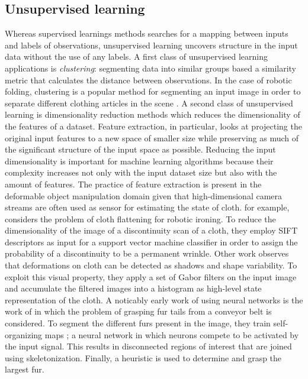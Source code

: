 \documentclass[\home/main.tex]{subfiles}
\begin{document}
\subsection{Unsupervised learning}
Whereas supervised learnings methods searches for a mapping between inputs and labels of observations, unsupervised learning uncovers structure in the input data without the use of any labels.
A first class of unsupervised learning applications is \emph{clustering}: segmenting data into similar groups based a similarity metric that calculates the distance between observations. In the case of robotic folding, clustering is a popular method for segmenting an input image in order to separate different clothing articles in the scene \autocite{Doumanoglou2016,Maitin2010,Jia2018}. A second class of unsupervised learning is dimensionality reduction methods which reduces the dimensionality of the features of a dataset. Feature extraction, in particular, looks at projecting the original input features to a new space of smaller size while preserving as much of the significant structure of the input space as possible. Reducing the input dimensionality is important for machine learning algorithms because their complexity increases not only with the input dataset size but also with the amount of features. 
The practice of feature extraction is present in the deformable object manipulation domain given that high-dimensional camera streams are often used as sensor for estimating the state of cloth. \textcite{li2016multi} for example, considers the problem of cloth flattening for robotic ironing. To reduce the dimensionality of the image of a discontinuity scan of a cloth, they employ SIFT descriptors \autocite{lowe1999object} as input for a support vector machine classifier in order to assign the probability of a discontinuity to be a permanent wrinkle. Other work \autocite{Jia2018} observes that deformations on cloth can be detected as shadows and shape variability. To exploit this visual property, they apply a set of Gabor filters on the input image and accumulate the filtered images into a histogram as high-level state representation of the cloth.
A noticably early work of using neural networks is the work of \textcite{Foresti2004} in which the problem of grasping fur tails from a conveyor belt is considered. To segment the different furs present in the image, they train self-organizing maps \autocite{Kohonen1982}; a neural network in which neurons compete to be activated by the input signal. This results in disconnected regions of interest that are joined using skeletonization. Finally, a heuristic is used to determine and grasp the largest fur.
\end{document}
